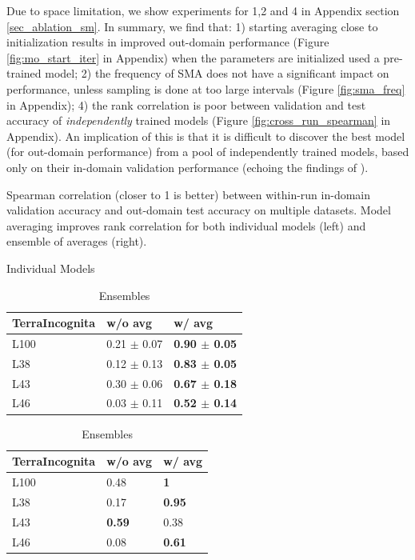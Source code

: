 \documentclass{article}
\begin{document}
Due to space limitation, we show experiments for 1,2 and 4 in Appendix section \ref{sec_ablation_sm}. In summary, we find that: 1) starting averaging close to initialization results in improved out-domain performance (Figure \ref{fig:mo_start_iter} in Appendix) when the parameters are initialized used a pre-trained model; 2) the frequency of SMA does not have a significant impact on performance, unless sampling is done at too large intervals (Figure \ref{fig:sma_freq} in Appendix); 4) the rank correlation is poor between validation and test accuracy of \textit{independently} trained models (Figure \ref{fig:cross_run_spearman} in Appendix). An implication of this is that it is difficult to discover the best model (for out-domain performance) from a pool of independently trained models, based only on their in-domain validation performance (echoing the findings of \cite{d2020underspecification}).

\begin{table}[t]
\caption{Spearman correlation (closer to 1 is better) between within-run in-domain validation accuracy and out-domain test accuracy on multiple datasets. Model averaging improves rank correlation for both individual models (left) and ensemble of averages (right).}
\begin{minipage}{.5\linewidth}
      \caption{Individual Models}
      \centering
        \begin{tabular}{lll}
        \hhline{===}
        TerraIncognita    & w/o avg & w/ avg   \\ \hline
        L100     & 0.21 $\pm$ 0.07   & \textbf{0.90 $\pm$ 0.05}   \\
        L38 & 0.12 $\pm$ 0.13   & \textbf{0.83 $\pm$ 0.05}  \\
        L43   & 0.30 $\pm$ 0.06   & \textbf{0.67 $\pm$ 0.18} \\
        L46  & 0.03 $\pm$ 0.11   & \textbf{0.52 $\pm$ 0.14}  \\ 
        \hline
        \end{tabular}
        \label{tab:rank_correlation_single}
    \end{minipage}%
    \begin{minipage}{.5\linewidth}
      \centering
        \caption{Ensembles}
        \begin{tabular}{lll}
        \hhline{===}
        TerraIncognita    & w/o avg & w/ avg   \\ \hline
        L100     & 0.48   & \textbf{1}   \\
        L38 & 0.17   & \textbf{0.95}  \\
        L43   & \textbf{0.59}   & 0.38 \\
        L46  & 0.08   & \textbf{0.61}  \\ 
        \hline
        \end{tabular}
        \label{tab:rank_correlation_ensemble_single}
    \end{minipage} 
\end{table}
\end{document}
